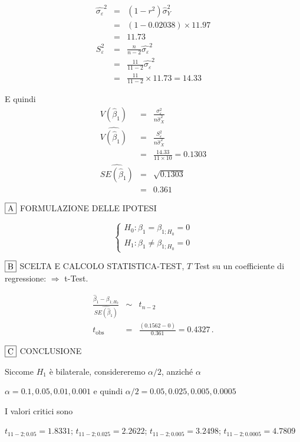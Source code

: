 \documentclass[
  11pt,
]{book}
\theoremstyle{mytheoremstyle}
\theoremstyle{mydefstyle}
\newenvironment{sol}
  {
  \begin{tcolorbox}[enhanced,breakable,arc=0.1mm,boxrule=1pt,colback=white,colframe=iblue,
  title=\bf \fontfamily{lmss}\selectfont \hspace{.5 cm} Soluzione,drop fuzzy shadow]

}{
\end{tcolorbox}
  }
\begin{document}
\begin{sol}
\begin{eqnarray*}
\hat{\sigma_\varepsilon}^2&=&(1-r^2)\hat\sigma_Y^2\\
&=& (1- 0.02038 )\times 11.97 \\
   &=&  11.73 \\
   S_\varepsilon^2 &=& \frac{n} {n-2} \hat{\sigma_\varepsilon}^2\\
   &=&  \frac{ 11 } { 11 -2} \hat{\sigma_\varepsilon}^2 \\
 &=&  \frac{ 11 } { 11 -2} \times  11.73  =  14.33  
\end{eqnarray*}

E quindi\begin{eqnarray*}
V(\hat\beta_{1}) &=& \frac{\sigma_{\varepsilon}^{2}} {n \hat{\sigma}^{2}_{X}} \\
\widehat{V(\hat\beta_{1})} &=& \frac{S_{\varepsilon}^{2}} {n \hat{\sigma}^{2}_{X}} \\
 &=& \frac{ 14.33 } { 11 \times  10 } =  0.1303 \\
 \widehat{SE(\hat\beta_{1})}        &=&  \sqrt{ 0.1303 }\\
 &=&  0.361 
\end{eqnarray*}

\(\fbox{A}\) FORMULAZIONE DELLE IPOTESI

\[\begin{cases}
   H_0: \beta_1 = \beta_{1;H_0}=0 \\
   H_1: \beta_1 \neq \beta_{1;H_0}=0 
   \end{cases}\]

\(\fbox{B}\) SCELTA E CALCOLO STATISTICA-TEST, \(T\)
Test su un coefficiente di regressione: \(\Rightarrow\) t-Test.

\begin{eqnarray*}
 \frac{\hat\beta_{ 1 } - \beta_{ 1 ;H_0}} {\widehat{SE(\hat\beta_{ 1 })}}&\sim&t_{n-2}\\
   t_{\text{obs}}
&=& \frac{ ( 0.1562 -  0 )} { 0.361 }
 =   0.4327 \, .
\end{eqnarray*}

\(\fbox{C}\) CONCLUSIONE

Siccome \(H_1\) è bilaterale, considereremo \(\alpha/2\),
anziché \(\alpha\)

\(\alpha=0.1, 0.05, 0.01, 0.001\) e quindi \(\alpha/2=0.05, 0.025, 0.005, 0.0005\)

I valori critici sono

\(t_{11-2;0.05}=1.8331\); \(t_{11-2;0.025}=2.2622\); \(t_{11-2;0.005}=3.2498\); \(t_{11-2;0.0005}=4.7809\)


\end{sol}
\end{document}
